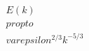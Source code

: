 \documentclass[preview]{standalone}
\begin{document}
\begin{align*}
E(k) \\propto \\varepsilon^{2/3} k^{-5/3}
\end{align*}
\end{document}
